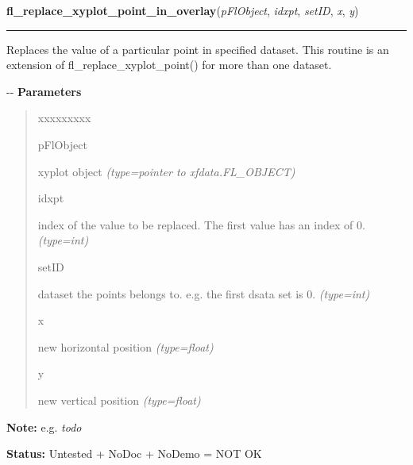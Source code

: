     \vspace{0.5ex}

\hspace{.8\funcindent}\begin{boxedminipage}{\funcwidth}

    \raggedright \textbf{fl\_replace\_xyplot\_point\_in\_overlay}(\textit{pFlObject}, \textit{idxpt}, \textit{setID}, \textit{x}, \textit{y})

    \vspace{-1.5ex}

    \rule{\textwidth}{0.5\fboxrule}
\setlength{\parskip}{2ex}

Replaces the value of a particular point in specified dataset. This
routine is an extension of fl\_replace\_xyplot\_point() for more than one
dataset.

-{}-
\setlength{\parskip}{1ex}
      \textbf{Parameters}
      \vspace{-1ex}

      \begin{quote}
        \begin{Ventry}{xxxxxxxxx}

          \item[pFlObject]


xyplot object
            {\it (type=pointer to xfdata.FL\_OBJECT)}

          \item[idxpt]


index of the value to be replaced. The first value has an index of 0.
            {\it (type=int)}

          \item[setID]


dataset the points belongs to. e.g. the first dsata set is 0.
            {\it (type=int)}

          \item[x]


new horizontal position
            {\it (type=float)}

          \item[y]


new vertical position
            {\it (type=float)}

        \end{Ventry}

      \end{quote}

\textbf{Note:} 
e.g. \emph{todo}


\textbf{Status:} 
Untested + NoDoc + NoDemo = NOT OK


    \end{boxedminipage}


